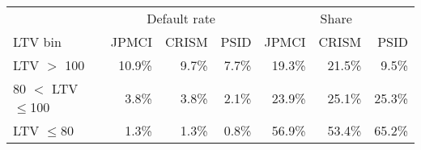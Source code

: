 \begin{tabular}{lrrrrrr}
\hline\hline
 & \multicolumn{3}{c}{Default rate} & \multicolumn{3}{c}{Share} \\ 
\cmidrule(lr){2-4} \cmidrule(lr){5-7}
LTV bin & JPMCI & CRISM & PSID & JPMCI & CRISM & PSID \\ 
\midrule
LTV $>$ 100 & 10.9\% & 9.7\% & 7.7\% & 19.3\% & 21.5\% & 9.5\% \\ 
80 $<$ LTV $\leq$100 & 3.8\% & 3.8\% & 2.1\% & 23.9\% & 25.1\% & 25.3\% \\ 
LTV $\leq$80 & 1.3\% & 1.3\% & 0.8\% & 56.9\% & 53.4\% & 65.2\% \\ 
\bottomrule
\end{tabular}
